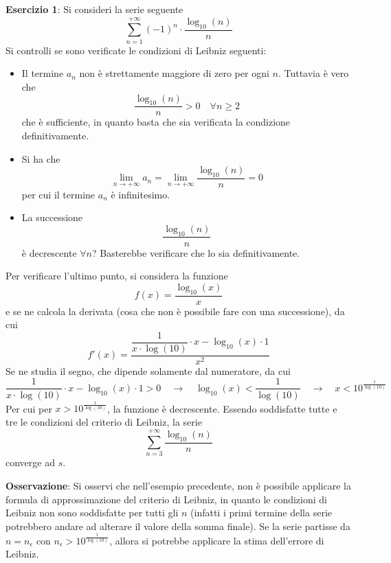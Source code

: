 \documentclass[a4paper]{extarticle}
\begin{document}
\vspace{1em}
\noindent
\textbf{Esercizio 1}: Si consideri la serie seguente
\[\sum_{n=1}^{+\infty} (-1)^n \cdot \frac{\log_{10}(n)}{n}\]
Si controlli se sono verificate le condizioni di Leibniz seguenti:
\begin{itemize}
    \item Il termine $a_n$ non è strettamente maggiore di zero per ogni $n$. Tuttavia è vero che
    \[\frac{\log_{10}(n)}{n} > 0 \hspace{1em} \forall n \geq 2\]
    che è sufficiente, in quanto basta che sia verificata la condizione definitivamente.

    \item Si ha che
    \[\lim_{n \to +\infty} a_n = \lim_{n \to +\infty} \frac{\log_{10}(n)}{n} = 0\]
    per cui il termine $a_n$ è infinitesimo.

    \item La successione
    \[\frac{\log_{10}(n)}{n}\]
    è decrescente $\forall n$? Basterebbe verificare che lo sia definitivamente.
\end{itemize}
Per verificare l'ultimo punto, si considera la funzione
\[f(x) = \frac{\log_{10}(x)}{x}\]
e se ne calcola la derivata (cosa che non è possibile fare con una successione), da cui
\[f'(x) = \dfrac{\dfrac{1}{x \cdot \log(10)} \cdot x - \log_{10}(x) \cdot 1}{x^2}\]
Se ne studia il segno, che dipende solamente dal numeratore, da cui
\[\frac{1}{x \cdot \log(10)} \cdot x - \log_{10}(x) \cdot 1 > 0 \hspace{1em} \rightarrow \hspace{1em} \log_{10}(x) < \frac{1}{\log(10)} \hspace{1em} \rightarrow \hspace{1em} x < 10^{\frac{1}{\log(10)}}\]
Per cui per $x > 10^{\frac{1}{\log(10)}}$, la funzione è decrescente. Essendo soddisfatte tutte e tre le condizioni del criterio di Leibniz, la serie
\[\sum_{n=3}^{+\infty} \frac{\log_{10}(n)}{n}\]
converge ad $s$.

\vspace{1em}
\noindent
\textbf{Osservazione}: Si osservi che nell'esempio precedente, non è possibile applicare la formula di approssimazione del criterio di Leibniz, in quanto le condizioni di Leibniz non sono soddisfatte per tutti gli $n$ (infatti i primi termine della serie potrebbero andare ad alterare il valore della somma finale). Se la serie partisse da $n=n_\epsilon$ con $n_\epsilon>10^{\frac{1}{\log(10)}}$, allora si potrebbe applicare la stima dell'errore di Leibniz.
\end{document}
